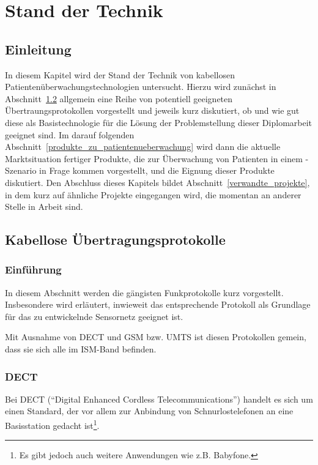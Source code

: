 
\chapter{Stand der Technik}\label{Stand der Technik}

\section{Einleitung}
In diesem Kapitel wird der Stand der Technik von kabellosen Patientenüberwachungstechnologien untersucht. 
Hierzu wird zunächst in Abschnitt~\ref{kabellose_uebertragungsprotokolle} allgemein eine Reihe von potentiell
geeigneten Übertraungsprotokollen vorgestellt und jeweils kurz diskutiert, ob und wie gut diese als 
Basistechnologie für die Lösung der Problemstellung dieser Diplomarbeit geeignet sind. Im darauf folgenden
Abschnitt~\ref{produkte_zu_patientenueberwachung} wird dann die aktuelle Marktsituation fertiger Produkte,
die zur Überwachung von Patienten in einem -Szenario in Frage kommen vorgestellt, und die Eignung dieser
Produkte diskutiert. Den Abschluss dieses Kapitels bildet Abschnitt~\ref{verwandte_projekte}, in dem
kurz auf ähnliche Projekte eingegangen wird, die momentan an anderer Stelle in Arbeit sind.

\section{Kabellose Übertragungsprotokolle}\label{kabellose_uebertragungsprotokolle}
    \subsection{Einführung}
        In diesem Abschnitt werden die gängisten Funkprotokolle kurz vorgestellt. Insbesondere wird erläutert,
        inwieweit das entsprechende Protokoll als Grundlage für das zu entwickelnde Sensornetz geeignet ist.

        Mit Ausnahme von DECT und GSM bzw. UMTS ist diesen Protokollen gemein, dass sie sich alle im ISM-Band 
        befinden. 

    \subsection{DECT}
        Bei DECT ("`Digital Enhanced Cordless Telecommunications"') handelt es sich um einen Standard, 
        der vor allem zur Anbindung von Schnurlostelefonen an eine Basisstation gedacht ist\footnote{Es gibt
        jedoch auch weitere Anwendungen wie z.B. Babyfone.}. 

